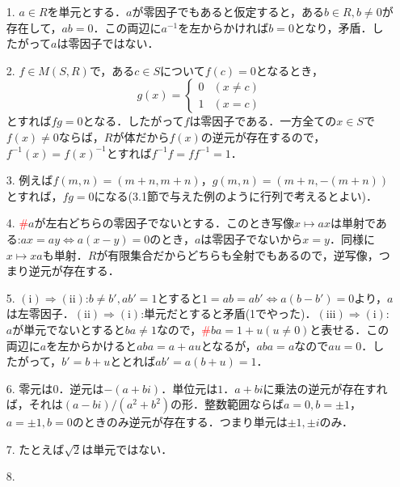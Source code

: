 \documentclass[a4paper,10pt,uplatex]{jsarticle}
\numberwithin{equation}{section}
\theoremstyle{mystyle}
\begin{document}
\begin{itemize}
    \item[1.] $a \in R$を単元とする．$a$が零因子でもあると仮定すると，ある$b \in R, b \neq 0$が存在して，$ab = 0$．この両辺に$a^{-1}$を左からかければ$b = 0$となり，矛盾．したがって$a$は零因子ではない．
    \item[2.] $f \in M(S,R)$で，ある$c \in S$について$f(c) = 0$となるとき，
    \begin{equation}
        g(x) = \begin{cases}
            0 & (x \neq c) \\
            1 & (x = c)
        \end{cases}
    \end{equation}
    とすれば$fg = 0$となる．したがって$f$は零因子である．一方全ての$x \in S$で$f(x) \neq 0$ならば，$R$が体だから$f(x)$の逆元が存在するので，$f^{-1}(x) = f(x)^{-1}$とすれば$f^{-1}f = ff^{-1} = 1$．
    \item[3.] 例えば$f(m,n) = (m+n, m+n)$，$g(m,n) = (m+n, -(m+n))$とすれば，$fg = 0$になる(3.1節で与えた例のように行列で考えるとよい)．
    \item[4.] \textcolor{red}{\#}$a$が左右どちらの零因子でないとする．このとき写像$x \mapsto ax$は単射である:$ax = ay \Leftrightarrow a(x-y)=0$のとき，$a$は零因子でないから$x = y$．同様に$x \mapsto xa$も単射．$R$が有限集合だからどちらも全射でもあるので，逆写像，つまり逆元が存在する．
    \item[5.] $\mathrm{(i)} \Rightarrow \mathrm{(ii)}$:$b \neq b',ab'=1$とすると$1 = ab = ab' \Leftrightarrow a(b - b') = 0$より，$a$は左零因子．$\mathrm{(ii)} \Rightarrow \mathrm{(i)}$:単元だとすると矛盾(1でやった)．$\mathrm{(iii)} \Rightarrow \mathrm{(i)}$:$a$が単元でないとすると$ba \neq 1$なので，\textcolor{red}{\#}$ba = 1 + u(u \neq 0)$と表せる．この両辺に$a$を左からかけると$aba = a + au$となるが，$aba = a$なので$au = 0$．したがって，$b' = b + u$ととれば$ab' = a(b + u) = 1$．
    \item[6.] 零元は$0$．逆元は$-(a+bi)$．単位元は$1$．$a+bi$に乗法の逆元が存在すれば，それは$(a-bi)/(a^2+b^2)$の形．整数範囲ならば$a=0,b=\pm 1$，$a=\pm 1,b=0$のときのみ逆元が存在する．つまり単元は$\pm 1, \pm i$のみ．
    \item[7.] たとえば$\sqrt{2}$は単元ではない．
    \item[8.]  
\end{itemize}
\end{document}
